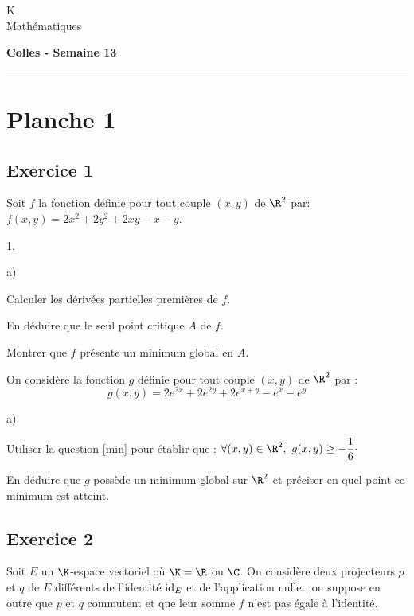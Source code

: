 \documentclass[11pt]{article}%
\begin{document}
\begin{flushleft}
K \\
Mathématiques
\end{flushleft}

\begin{center}
\textbf{\Large{Colles - Semaine 13}}
\end{center}

\hrule

\vspace*{0,2cm}

\section*{Planche 1} 

\subsection*{Exercice 1}
\noindent
Soit $f$ la fonction définie pour tout couple $(x,y)$ de $\R^{2}$
par: $f(x,y) = 2 x^{2} +2 y^{2}+ 2xy - x - y$.
\begin{noliste}{1.}
\item
\begin{noliste}{a)}
\item 
Calculer les dérivées partielles premières de $f$.
\item  
En déduire que le seul point critique $A$ de $f$.%
\end{noliste}
\item\label{min}
Montrer que $f$ présente un minimum global en $A$.
\item 
On considère la fonction $g$ définie pour tout couple $(x,y)$ de 
$\R^{2}$ par :
\[
 g(x,y) = 2 e^{2x} + 2 e^{2y} + 2 e^{x+y} - e^{x}- e^{y}
\]
\begin{noliste}{a)}
\item 
Utiliser la question \ref{min} pour établir que : \quad $\forall(x,y)\in 
\R^{2},\ g(x,y) \ge -\dfrac{1}{6}\cdotp$
\item 
En déduire que $g$ possède un minimum global sur $\R^{2}$ et préciser en 
quel point ce minimum est atteint.
\end{noliste}
\end{noliste}

\subsection*{Exercice 2} %
\noindent
Soit $E$ un $\K$-espace vectoriel où $\K=\R$ ou $\C$. On
considère deux projecteurs $p$ et $q$ de $E$ différents de
l'identité ${\rm{id}}_E$ et de l'application nulle ; on suppose en outre
que $p$ et $q$ commutent et que leur somme $f$ n'est pas égale
à l'identité.
\end{document}
